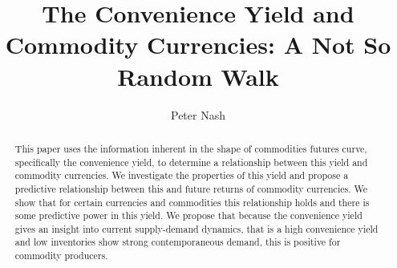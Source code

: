 \documentclass[a4paper,10pt]{article}
\title{The Convenience Yield and Commodity Currencies: A Not So Random Walk}
\author{Peter Nash}
\begin{document}
\maketitle

\begin{abstract}
This paper uses the information inherent in the shape of commodities futures curve, specifically the convenience yield, to determine a relationship between this yield and commodity currencies. We investigate the properties of this yield and propose a predictive relationship between this and future returns of commodity currencies. We show that for certain currencies and commodities this relationship holds and there is some predictive power in this yield. We propose that because the convenience yield gives an insight into current supply-demand dynamics, that is a high convenience yield and low inventories show strong contemporaneous demand, this is positive for commodity producers. 

\end{abstract}











\end{document}
